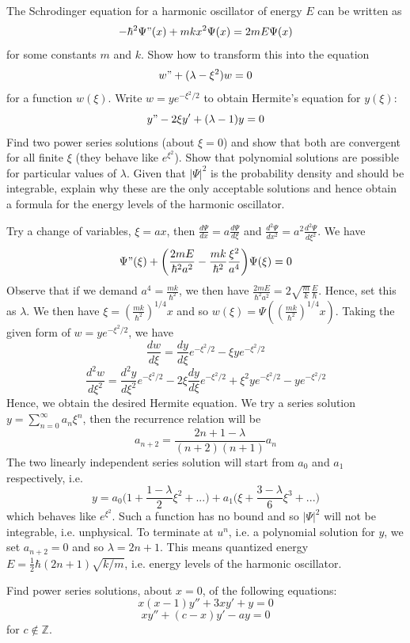\documentclass[a4paper]{article}
\begin{document}
\newpage
\begin{qns}
The Schrodinger equation for a harmonic oscillator of energy $E$ can be written as
$$-\hbar^2\Psi"(x)+mkx^2\Psi(x)=2mE\Psi(x)$$
for some constants $m$ and $k$. Show how to transform this into the equation
$$w"+(\lambda-\xi^2)w=0$$
for a function $w(\xi)$. Write $w=ye^{-\xi^2/2}$ to obtain Hermite's equation for $y(\xi)$:
$$y"-2\xi y'+(\lambda-1)y=0$$
Find two power series solutions (about $\xi=0$) and show that both are convergent for all finite $\xi$ (they behave like $e^{\xi^2}$). Show that polynomial solutions are possible for particular values of $\lambda$. Given that $|\Psi|^2$ is the probability density and should be integrable, explain why these are the only acceptable solutions and hence obtain a formula for the energy levels of the harmonic oscillator.
\end{qns}
\begin{ans}
Try a change of variables, $\xi=ax$, then $\frac{d\Psi}{dx}=a\frac{d\Psi}{d\xi}$ and $\frac{d^2\Psi}{dx^2}=a^2\frac{d^2\Psi}{d\xi^2}$. We have
$$\Psi"(\xi)+\bigg(\frac{2mE}{\hbar^2a^2}-\frac{mk}{\hbar^2}\frac{\xi^2}{a^4}\bigg)\Psi(\xi)=0$$
Observe that if we demand $a^4=\frac{mk}{\hbar^2}$, we then have $\frac{2mE}{\hbar^2a^2}=2\sqrt{\frac{m}{k}}\frac{E}{\hbar}$. Hence, set this as $\lambda$. We then have $\xi=(\frac{mk}{\hbar^2})^{1/4}x$ and so $w(\xi)=\Psi((\frac{mk}{\hbar^2})^{1/4}x)$. Taking the given form of $w=ye^{-\xi^2/2}$, we have
$$\frac{dw}{d\xi}=\frac{dy}{d\xi}e^{-\xi^2/2}-\xi ye^{-\xi^2/2}$$
$$\frac{d^2w}{d\xi^2}=\frac{d^2y}{d\xi^2}e^{-\xi^2/2}-2\xi\frac{dy}{d\xi}e^{-\xi^2/2}+\xi^2ye^{-\xi^2/2}-ye^{-\xi^2/2}$$
Hence, we obtain the desired Hermite equation. We try a series solution $y=\sum_{n=0}^\infty a_n\xi^n$, then the recurrence relation will be
$$a_{n+2}=\frac{2n+1-\lambda}{(n+2)(n+1)}a_n$$
The two linearly independent series solution will start from $a_0$ and $a_1$ respectively, i.e.
$$y=a_0\bigg(1+\frac{1-\lambda}{2}\xi^2+...\bigg)+a_1\bigg(\xi+\frac{3-\lambda}{6}\xi^3+...\bigg)$$
which behaves like $e^{\xi^2}$. Such a function has no bound and so $|\Psi|^2$ will not be integrable, i.e. unphysical. To terminate at $u^n$, i.e. a polynomial solution for $y$, we set $a_{n+2}=0$ and so $\lambda=2n+1$. This means quantized energy $E=\frac{1}{2}\hbar(2n+1)\sqrt{k/m}$, i.e. energy levels of the harmonic oscillator. 
\end{ans}
\begin{qns}
Find power series solutions, about $x = 0$, of the following equations:
$$x(x-1)y''+3xy'+y=0$$
$$xy''+(c-x)y'-ay=0$$
for $c\notin\mathbb{Z}$.
\end{qns}
\end{document}
